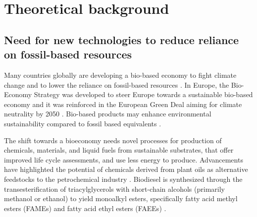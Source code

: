 \chapter{Theoretical background}

\section{Need for new technologies to reduce reliance on fossil-based resources} 



Many countries globally are developing a bio-based economy to fight climate change and to lower the
reliance on fossil-based resources \cite{Zuiderveen2023}. In Europe, 
the Bio-Economy Strategy was developed to steer Europe towards a sustainable 
bio-based economy and it was reinforced in the European Green Deal aiming for 
climate neutrality by 2050 \cite{Research2018}. Bio-based products may enhance environmental 
sustainability compared to fossil based equivalents \cite{Zuiderveen2023}.

The shift towards a bioeconomy needs novel processes for production of chemicals, materials, 
and liquid fuels from sustainable substrates, that offer improved life cycle 
assessments, and use less energy to produce. Advancements have highlighted the 
potential of chemicals derived from plant oils as alternative 
feedstocks to the petrochemical industry \cite{Durrett2008}.
Biodiesel is synthesized through the 
transesterification of triacylglycerols with short-chain alcohols 
(primarily methanol or ethanol) to yield monoalkyl esters, specifically fatty acid methyl esters (FAMEs) 
and fatty acid ethyl esters (FAEEs) \cite{Koutinas2014}.

